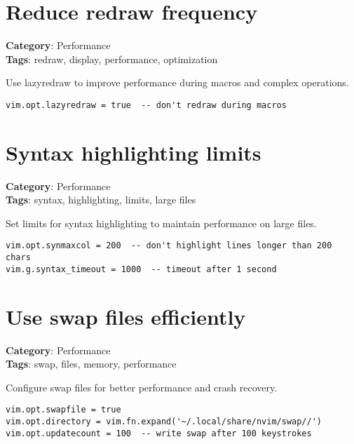{{{{{{{{{\section{Reduce redraw frequency}

\textbf{Category}: Performance\\ \textbf{Tags}: redraw, display, performance, optimization
\vspace{0.5cm}

Use lazyredraw to improve performance during macros and complex operations.

\begin{Exa*}{}
\begin{Verbatim}[fontsize=\footnotesize, breaklines, breakanywhere]
vim.opt.lazyredraw = true  -- don't redraw during macros
\end{Verbatim}
\end{Exa*}

\section{Syntax highlighting limits}

\textbf{Category}: Performance\\ \textbf{Tags}: syntax, highlighting, limits, large files
\vspace{0.5cm}

Set limits for syntax highlighting to maintain performance on large files.

\begin{Exa*}{}
\begin{Verbatim}[fontsize=\footnotesize, breaklines, breakanywhere]
vim.opt.synmaxcol = 200  -- don't highlight lines longer than 200 chars
vim.g.syntax_timeout = 1000  -- timeout after 1 second
\end{Verbatim}
\end{Exa*}

\section{Use swap files efficiently}

\textbf{Category}: Performance\\ \textbf{Tags}: swap, files, memory, performance
\vspace{0.5cm}

Configure swap files for better performance and crash recovery.

\begin{Exa*}{}
\begin{Verbatim}[fontsize=\footnotesize, breaklines, breakanywhere]
vim.opt.swapfile = true
vim.opt.directory = vim.fn.expand('~/.local/share/nvim/swap//')
vim.opt.updatecount = 100  -- write swap after 100 keystrokes
\end{Verbatim}
\end{Exa*}

}}}}}}}}}
